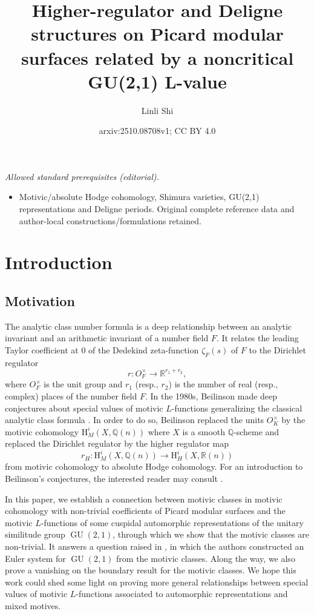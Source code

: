 \documentclass[11pt, a4paper]{amsart}
\title{Higher-regulator and Deligne structures on Picard modular surfaces related by a noncritical GU(2,1) L-value}
\author{Linli Shi}
\date{arxiv:2510.08708v1; CC BY 4.0}
\theoremstyle{plain}
\theoremstyle{definition}
\numberwithin{equation}{section}
\def\QQ{\mathbb{Q}}
\def\RR{\mathbb{R}}
\DeclareMathOperator{\GU}{GU}
\begin{document}
\maketitle
\noindent\textit{Allowed standard prerequisites (editorial).}\begin{itemize}
\item Motivic/absolute Hodge cohomology, Shimura varieties, GU(2,1) representations and Deligne periods. Original complete reference data and author-local constructions/formulations retained.
\end{itemize}\medskip
\section{Introduction}
\subsection{Motivation}
\label{SS: motivation}
The analytic class number formula is a deep relationship between an analytic invariant and an arithmetic invariant of a number field $F$. It relates the leading Taylor coefficient at $0$ of the Dedekind zeta-function $\zeta_{F}(s)$ of $F$ to the Dirichlet regulator 
\begin{equation*}
    r\colon O_F^{\times} \rightarrow \RR^{r_1 + r_2},
\end{equation*}
where $O_F^{\times}$ is the unit group and $r_1$ (resp., $r_2$) is the number of real (resp., complex) places of the number field $F$.  In the 1980s, Beilinson made deep conjectures about special values of motivic $L$-functions generalizing the classical analytic class formula \cite{Beilinson85}. In order to do so, Beilinson replaced the units $O_{K}^{\times}$ by the motivic cohomology $\mathrm{H}^{i}_{M}(X, \QQ(n))$ where $X$ is a smooth $\QQ$-scheme and replaced the Dirichlet regulator by the higher regulator map 
\begin{equation*}
    r_{H}\colon \mathrm{H}^{i}_{M}(X, \QQ(n)) \rightarrow \mathrm{H}_{H}^{i}(X, \RR(n))
\end{equation*}
from motivic cohomology to absolute Hodge cohomology. For an introduction to Beilinson's conjectures, the interested reader may consult \cite{Nekovar94}. 

\par In this paper, we establish a connection between motivic classes in motivic cohomology with non-trivial coefficients of Picard modular surfaces and the motivic $L$-functions of some cuspidal automorphic representations of the unitary similitude group $\GU(2, 1)$, through which we show that the motivic classes are non-trivial. It answers a question raised in \cite{LSZ22}, in which the authors constructed an Euler system for $\GU(2, 1)$ from the motivic classes. Along the way, we also prove a vanishing on the boundary result for the motivic classes. We hope this work could shed some light on proving more general relationships between special values of motivic $L$-functions associated to automorphic representations and mixed motives. 
\end{document}
